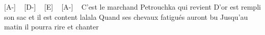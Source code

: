 
[A-] ~ [D-] ~ [E] ~ [A-] ~
C'est le marchand Petrouchka qui revient
D'or est rempli son sac et il est content lalala
Quand ses chevaux fatigués auront bu
Jusqu'au matin il pourra rire et chanter